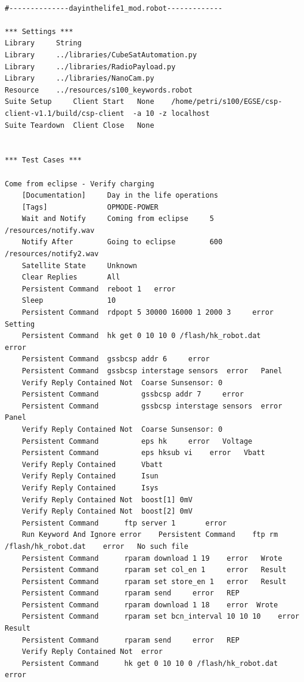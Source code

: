 \documentclass[english,12pt,a4paper,pdftex,elec,utf8]{aaltothesis}
\begin{document}
\begin{verbatim}

#--------------dayinthelife1_mod.robot-------------

*** Settings ***
Library		String
Library		../libraries/CubeSatAutomation.py
Library		../libraries/RadioPayload.py
Library		../libraries/NanoCam.py
Resource	../resources/s100_keywords.robot
Suite Setup		Client Start   None    /home/petri/s100/EGSE/csp-client-v1.1/build/csp-client  -a 10 -z localhost
Suite Teardown	Client Close   None


*** Test Cases ***

Come from eclipse - Verify charging
    [Documentation]     Day in the life operations
    [Tags]              OPMODE-POWER
    Wait and Notify     Coming from eclipse     5   /resources/notify.wav
    Notify After        Going to eclipse        600     /resources/notify2.wav
    Satellite State     Unknown
    Clear Replies       All
    Persistent Command  reboot 1   error
    Sleep               10
    Persistent Command  rdpopt 5 30000 16000 1 2000 3     error   Setting
    Persistent Command  hk get 0 10 10 0 /flash/hk_robot.dat           error
    Persistent Command  gssbcsp addr 6     error
    Persistent Command  gssbcsp interstage sensors  error   Panel
    Verify Reply Contained Not  Coarse Sunsensor: 0
    Persistent Command          gssbcsp addr 7     error
    Persistent Command          gssbcsp interstage sensors  error   Panel
    Verify Reply Contained Not  Coarse Sunsensor: 0
    Persistent Command          eps hk     error   Voltage
    Persistent Command          eps hksub vi    error   Vbatt
    Verify Reply Contained      Vbatt
    Verify Reply Contained      Isun
    Verify Reply Contained      Isys
    Verify Reply Contained Not  boost[1] 0mV
    Verify Reply Contained Not  boost[2] 0mV
    Persistent Command      ftp server 1       error
    Run Keyword And Ignore error    Persistent Command    ftp rm /flash/hk_robot.dat    error   No such file
    Persistent Command      rparam download 1 19    error   Wrote
    Persistent Command      rparam set col_en 1     error   Result
    Persistent Command      rparam set store_en 1   error   Result
    Persistent Command      rparam send     error   REP
    Persistent Command      rparam download 1 18    error  Wrote
    Persistent Command      rparam set bcn_interval 10 10 10    error  Result
    Persistent Command      rparam send     error   REP
    Verify Reply Contained Not  error
    Persistent Command      hk get 0 10 10 0 /flash/hk_robot.dat    error


\end{verbatim}
\end{document}

